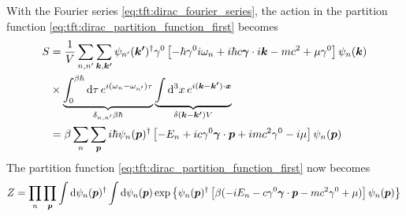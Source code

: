 With the Fourier series \eqref{eq:tft:dirac_fourier_series}, the action in the partition function \eqref{eq:tft:dirac_partition_function_first} becomes
\begin{equation}
\begin{split}
	S & = \frac{1}{V} \sum_{n,n'} \sum_{{\bm{k}},{\bm{k'}}} \psi_{n'}({\bm{k'}})^\dagger \gamma^0 \left[ -\hbar \gamma^0 i \omega_n + i \hbar c {\bm{\gamma}} \cdot i {\bm{k}} - m c^2 + \mu \gamma^0 \right] \psi_n({\bm{k}}) \\
	  & \times \underbrace{\int_0^{\beta \hbar} \mathop{}\!\mathrm{d} \tau \, e^{i(\omega_n-\omega_{n'})\tau}}_{\delta_{n,n'} \beta \hbar} \underbrace{\int \mathop{}\!\mathrm{d}^3 x \, e^{i({\bm{k}}-{\bm{k'}})\cdot{\bm{x}}}}_{\delta({\bm{k}} - {\bm{k'}}) V} \\
	  & = \beta       \sum_{n}   \sum_{{\bm{p}}}         i \hbar \psi_n({\bm{p}})^\dagger          \left[ -E_n + i c \gamma^0 {\bm{\gamma}} \cdot {\bm{p}} + i m c^2 \gamma^0 - i \mu \right] \psi_n({\bm{p}}) \\
\end{split}
\end{equation}
The partition function \eqref{eq:tft:dirac_partition_function_first} now becomes 
\begin{equation}
	Z %
	  = \prod_n \prod_\vec{p} \int \dif \psi_n(\vec{p})^\dagger \int \dif \psi_n(\vec{p}) 
	  \exp \left\{ \psi_n(\vec{p})^\dagger \left[ \beta( -i E_n - c \gamma^0 \vec{\gamma} \cdot \vec{p} - mc^2 \gamma^0 + \mu ) \right] \psi_n(\vec{p}) \right\} \\
\end{equation}

